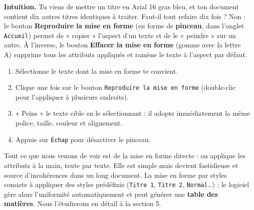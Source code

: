 \documentclass[11pt]{article}
\newcommand{\cle}[1]{{\popxbold\color{popdark}#1}}
\begin{document}
\textbf{Intuition.} Tu viens de mettre un titre en Arial 16 gras bleu, et ton document contient dix autres titres identiques à traiter. Faut-il tout refaire dix fois ? Non : le bouton \textbf{Reproduire la mise en forme} (en forme de \textbf{pinceau}, dans l'onglet \texttt{Accueil}) permet de « copier » l'aspect d'un texte et de le « peindre » sur un autre. À l'inverse, le bouton \textbf{Effacer la mise en forme} (gomme avec la lettre A) supprime tous les attributs appliqués et ramène le texte à l'aspect par défaut.

\begin{methode}
\begin{enumerate}
\item Sélectionne le texte dont la mise en forme te convient.
\item Clique une fois sur le bouton \texttt{Reproduire la mise en forme} (double-clic pour l'appliquer à plusieurs endroits).
\item « Peins » le texte cible en le sélectionnant : il adopte immédiatement la même police, taille, couleur et alignement.
\item Appuie sur \texttt{Échap} pour désactiver le pinceau.
\end{enumerate}
\end{methode}

\begin{definition}
Tout ce que nous venons de voir est de la \cle{mise en forme directe} : on applique les attributs à la main, texte par texte. Elle est simple mais devient fastidieuse et source d'incohérences dans un long document. La \cle{mise en forme par styles} consiste à appliquer des styles prédéfinis (\texttt{Titre 1}, \texttt{Titre 2}, \texttt{Normal}\ldots) : le logiciel gère alors l'uniformité automatiquement et peut générer une \textbf{table des matières}. Nous l'étudierons en détail à la section 5.
\end{definition}
\end{document}
